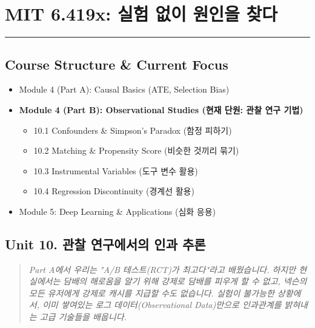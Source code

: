 \documentclass[11pt,a4paper]{book}
\theoremstyle{definition}
\begin{document}
\chapter{MIT 6.419x: 실험 없이 원인을 찾다}
\label{ch:lecture10}


\vspace{1cm}
\hrule
\vspace{1cm}

\section*{Course Structure \& Current Focus}
\begin{itemize}
    \item Module 4 (Part A): Causal Basics (ATE, Selection Bias)
    \item \textbf{\textcolor{mainblue}{Module 4 (Part B): Observational Studies (현재 단원: 관찰 연구 기법)}}
    \begin{itemize}
        \item 10.1 Confounders \& Simpson's Paradox (함정 피하기)
        \item 10.2 Matching \& Propensity Score (비슷한 것끼리 묶기)
        \item 10.3 Instrumental Variables (도구 변수 활용)
        \item 10.4 Regression Discontinuity (경계선 활용)
    \end{itemize}
    \item Module 5: Deep Learning \& Applications (심화 응용)
\end{itemize}


\section{Unit 10. 관찰 연구에서의 인과 추론}

\begin{quote}
\textit{Part A에서 우리는 "A/B 테스트(RCT)가 최고다"라고 배웠습니다. 하지만 현실에서는 담배의 해로움을 알기 위해 강제로 담배를 피우게 할 수 없고, 넥슨의 모든 유저에게 강제로 캐시를 지급할 수도 없습니다. 실험이 불가능한 상황에서, 이미 쌓여있는 로그 데이터(Observational Data)만으로 인과관계를 밝혀내는 고급 기술들을 배웁니다.}
\end{quote}
\end{document}
